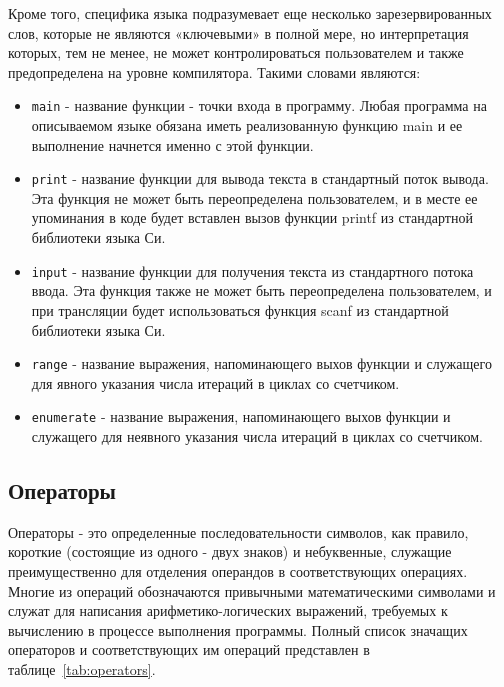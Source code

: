 Кроме того, специфика языка подразумевает еще несколько зарезервированных слов, которые не являются «ключевыми» в полной мере, но интерпретация которых, тем не менее, не может контролироваться пользователем и также предопределена на уровне компилятора.
Такими словами являются:

\begin{itemize}
    \item \verb|main| - название функции - точки входа в программу. Любая программа на описываемом языке обязана иметь реализованную функцию main и ее выполнение начнется именно с этой функции.
    \item \verb|print| - название функции для вывода текста в стандартный поток вывода. Эта функция не может быть переопределена пользователем, и в месте ее упоминания в коде будет вставлен вызов функции printf из стандартной библиотеки языка Си.
    \item \verb|input| - название функции для получения текста из стандартного потока ввода. Эта функция также не может быть переопределена пользователем, и при трансляции будет использоваться функция scanf из стандартной библиотеки языка Си.
    \item \verb|range| - название выражения, напоминающего выхов функции и служащего для явного указания числа итераций в циклах со счетчиком.
    \item \verb|enumerate| - название выражения, напоминающего выхов функции и служащего для неявного указания числа итераций в циклах со счетчиком.
\end{itemize}

\subsection{Операторы}
\label{sec:operators}

Операторы - это определенные последовательности символов, как правило, короткие (состоящие из одного - двух знаков) и небуквенные, служащие преимущественно для отделения операндов в соответствующих операциях.
Многие из операций обозначаются привычными математическими символами и служат для написания арифметико-логических выражений, требуемых к вычислению в процессе выполнения программы.
Полный список значащих операторов и соответствующих им операций представлен в таблице~\ref{tab:operators}.

